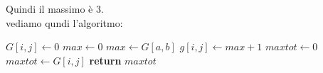 \documentclass[a4paper,12pt, oneside]{book}
\begin{document}
Quindi il massimo è 3.\\
vediamo qundi l'algoritmo:
\begin{algorithm}[H]
  \begin{algorithmic}
    \State $G[i,j]\gets 0$
    \Else
    \State $max\gets 0$
    \State $max \gets G[a,b]$
    \EndIf
    \EndFor
    \EndFor
    \State $g[i,j] \gets max +1$
    \EndIf
    \EndFor
    \EndFor
    \State $maxtot \gets 0$
    \State $maxtot \gets G[i,j]$
    \EndIf
    \EndFor
    \EndFor
    \State \textbf{return} $maxtot$
    \EndFunction
  \end{algorithmic}
\end{algorithm}
\end{document}
